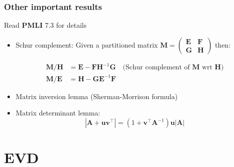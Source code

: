 \documentclass[smaller]{beamer}
\newcommand{\?}{\stackrel{?}{=}}
\newcommand{\tr}{^{\top}}
\begin{document}
\begin{frame}
  \frametitle{Other important results}
  \pause

  Read \textbf{PMLI} 7.3 for details

  \begin{itemize}
  \item Schur complement: \pause
  Given  a partitioned matrix $\bm M = \begin{pmatrix}
  	\bm E & \bm F \\ \bm G & \bm H
  \end{pmatrix}$ then:
  
  \begin{align}
  	\bm M/\bm H &= \bm E - \bm F\bm H^{-1} \bm G \quad \text{(Schur complement of $\bm M$ wrt $\bm H$)} \\
  	\bm M/\bm E &= \bm H - \bm G\bm E^{-1} \bm F
  \end{align}
  \item Matrix inversion lemma (Sherman-Morrison formula)
  \item Matrix determinant lemma:
    \begin{equation}
      |\bm A + \bm u\bm v\tr| = (1 + \bm v\tr\bm{A}^{-1})\bm u|\bm A|
    \end{equation}
  \end{itemize}
\end{frame}
  
\section{EVD}
\end{document}
